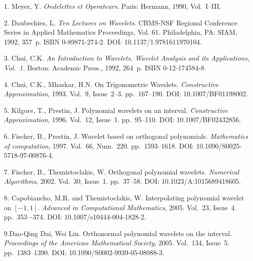 \documentclass[12pt]{book}
\begin{document}





\vspace*{2mm}%

\begin{Etwocolbib}%

1. Meyer, Y. \textit{Ondelettes et Operateurs}. Paris: Hermann, 1990, Vol.~I–III.

2. Daubechies, L. \textit{Ten Lectures on Wavelets}. CBMS-NSF Regional Conference Series in Applied Mathematics Proceedings, Vol. 61. Philadelphia, PA: SIAM, 1992, 357~p. ISBN 0-89871-274-2. DOI: 10.1137/1.9781611970104.

3. Chui, C.K. \textit{An Introduction to  Wavelets. Wavelet Analysis and its Applications, Vol.~1.} Boston: Academic Press., 1992, 264~p. ISBN 0-12-174584-8.

4. Chui, C.K., Mhaskar, H.N. On Trigonometric Wavelets. \textit{Constructive Approximation}, 1993. Vol.~9, Issue~2--3. pp.~167--190. DOI: 10.1007/BF01198002.

5. Kilgore, T., Prestin, J. Polynomial wavelets on an interval. \textit{Constructive Approximation}, 1996. Vol.~12, Issue~1. pp.~95--110. DOI: 10.1007/BF02432856.

6. Fischer, B., Prestin, J. Wavelet based on orthogonal polynomials. \textit{Mathematics of computation}, 1997. Vol.~66, Num.~220. pp.~1593--1618. DOI: 10.1090/S0025-5718-97-00876-4.

7. Fischer, B., Themistoclakis, W. Orthogonal polynomial wavelets. \textit{Numerical Algorithms}, 2002. Vol.~30, Issue~1. pp.~37--58. DOI: 10.1023/A:1015689418605.

8. Capobiancho, M.R. and Themistoclakis, W. Interpolating polynomial wavelet on $[-1,1]$. \textit{Advanced in Computational Mathematics}, 2005. Vol.~23, Issue~4. pp.~353–-374. DOI: 10.1007/s10444-004-1828-2.

9.Dao-Qing Dai, Wei Lin. Orthonormal polynomial wavelets on the interval. \textit{Proceedings of the American Mathematical Society}, 2005. Vol.~134, Issue~5. pp.~1383–1390. DOI: 10.1090/S0002-9939-05-08088-3.


\end{Etwocolbib}
\end{document}
